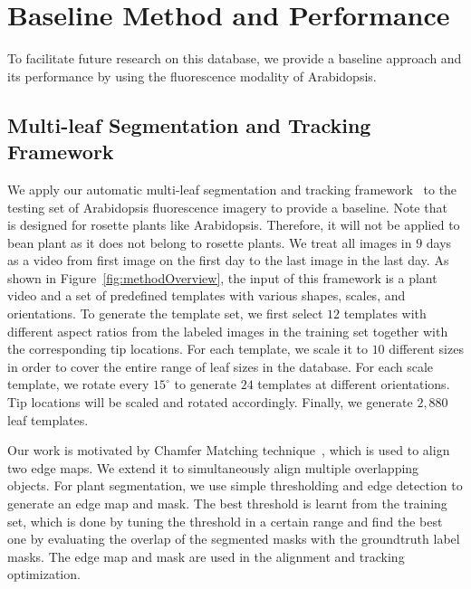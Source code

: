 \section{Baseline Method and Performance}
\label{sec:baseline}

To facilitate future research on this database, we provide a baseline approach and its performance by using the fluorescence modality of Arabidopsis.

\subsection{Multi-leaf Segmentation and Tracking Framework}
We apply our automatic multi-leaf segmentation and tracking framework~\cite{yin2014a,yin2014b} to the testing set of Arabidopsis fluorescence imagery to provide a baseline.
Note that~\cite{yin2014a,yin2014b} is designed for rosette plants like Arabidopsis.
Therefore, it will not be applied to bean plant as it does  not belong to rosette plants.
We treat all images in $9$ days as a video from first image on the first day to the last image in the last day.
As shown in Figure~\ref{fig:methodOverview}, the input of this framework is a plant video and a set of predefined templates with various shapes, scales, and orientations.
To generate the template set, we first select $12$ templates with different aspect ratios from the labeled images in the training set together with the corresponding tip locations.
For each template, we scale it to $10$ different sizes in order to cover the entire range of leaf sizes in the database.
For each scale template, we rotate every $15^{\circ}$ to generate $24$ templates at different orientations.
Tip locations will be scaled and rotated accordingly.
Finally, we generate $2,880$ leaf templates.



Our work is motivated by Chamfer Matching technique~\cite{barrow1977parametric}, which is used to align two edge maps.
We extend it to simultaneously align multiple overlapping objects.
For plant segmentation, we use simple thresholding and edge detection to generate an edge map and mask.
The best threshold is learnt from the training set, which is done by tuning the threshold in a certain range and find the best one by evaluating the overlap of the segmented masks with the groundtruth label masks.
The edge map and mask are used in the alignment and tracking optimization.

